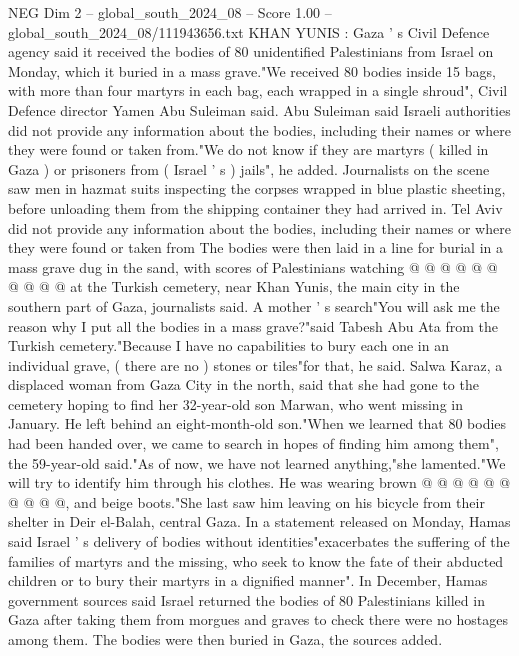 \begin{textsample}{NEG Dim 2 – global\_south\_2024\_08 – Score 1.00 – global\_south\_2024\_08/111943656.txt}  \label{ex:f2_neg_428}
KHAN YUNIS : Gaza ' s Civil Defence agency said it received the bodies of 80 unidentified Palestinians from Israel on Monday, which it buried in a mass grave."We received 80 bodies inside 15 bags, with more than four martyrs in each bag, each wrapped in a single shroud", Civil Defence director Yamen Abu Suleiman said.
Abu Suleiman said Israeli authorities did not provide any information about the bodies, including their names or where they were found or taken from."We do not know if they are martyrs ( killed in Gaza ) or prisoners from ( Israel ' s ) jails", he added.
Journalists on the scene saw men in hazmat suits inspecting the corpses wrapped in blue plastic sheeting, before unloading them from the shipping container they had arrived in.
Tel Aviv did not provide any information about the bodies, including their names or where they were found or taken from The bodies were then laid in a line for burial in a mass grave dug in the sand, with scores of Palestinians watching @ @ @ @ @ @ @ @ @ @ at the Turkish cemetery, near Khan Yunis, the main city in the southern part of Gaza, journalists said.
A mother ' s search"You will ask me the reason why I put all the bodies in a mass grave?"said Tabesh Abu Ata from the Turkish cemetery."Because I have no capabilities to bury each one in an individual grave, ( there are no ) stones or tiles"for that, he said.
Salwa Karaz, a displaced woman from Gaza City in the north, said that she had gone to the cemetery hoping to find her 32-year-old son Marwan, who went missing in January.
He left behind an eight-month-old son."When we learned that 80 bodies had been handed over, we came to search in hopes of finding him among them", the 59-year-old said."As of now, we have not learned anything,"she lamented."We will try to identify him through his clothes.
He was wearing brown @ @ @ @ @ @ @ @ @ @, and beige boots."She last saw him leaving on his bicycle from their shelter in Deir el-Balah, central Gaza.
In a statement released on Monday, Hamas said Israel ' s delivery of bodies without identities"exacerbates the suffering of the families of martyrs and the missing, who seek to know the fate of their abducted children or to bury their martyrs in a dignified manner".
In December, Hamas government sources said Israel returned the bodies of 80 Palestinians killed in Gaza after taking them from morgues and graves to check there were no hostages among them.
The bodies were then buried in Gaza, the sources added.

\end{textsample}
